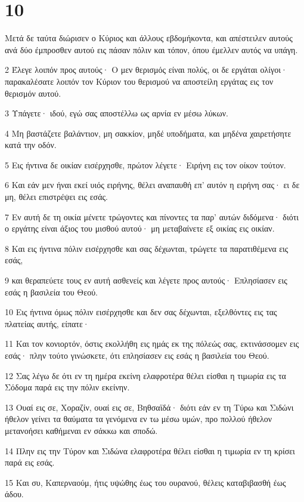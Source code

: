 \chapter{10}

\par Μετά δε ταύτα διώρισεν ο Κύριος και άλλους εβδομήκοντα, και απέστειλεν αυτούς ανά δύο έμπροσθεν αυτού εις πάσαν πόλιν και τόπον, όπου έμελλεν αυτός να υπάγη.
\par 2 Έλεγε λοιπόν προς αυτούς· Ο μεν θερισμός είναι πολύς, οι δε εργάται ολίγοι· παρακαλέσατε λοιπόν τον Κύριον του θερισμού να αποστείλη εργάτας εις τον θερισμόν αυτού.
\par 3 Υπάγετε· ιδού, εγώ σας αποστέλλω ως αρνία εν μέσω λύκων.
\par 4 Μη βαστάζετε βαλάντιον, μη σακκίον, μηδέ υποδήματα, και μηδένα χαιρετήσητε κατά την οδόν.
\par 5 Εις ήντινα δε οικίαν εισέρχησθε, πρώτον λέγετε· Ειρήνη εις τον οίκον τούτον.
\par 6 Και εάν μεν ήναι εκεί υιός ειρήνης, θέλει αναπαυθή επ' αυτόν η ειρήνη σας· ει δε μη, θέλει επιστρέψει εις εσάς.
\par 7 Εν αυτή δε τη οικία μένετε τρώγοντες και πίνοντες τα παρ' αυτών διδόμενα· διότι ο εργάτης είναι άξιος του μισθού αυτού· μη μεταβαίνετε εξ οικίας εις οικίαν.
\par 8 Και εις ήντινα πόλιν εισέρχησθε και σας δέχωνται, τρώγετε τα παρατιθέμενα εις εσάς,
\par 9 και θεραπεύετε τους εν αυτή ασθενείς και λέγετε προς αυτούς· Επλησίασεν εις εσάς η βασιλεία του Θεού.
\par 10 Εις ήντινα όμως πόλιν εισέρχησθε και δεν σας δέχωνται, εξελθόντες εις τας πλατείας αυτής, είπατε·
\par 11 Και τον κονιορτόν, όστις εκολλήθη εις ημάς εκ της πόλεώς σας, εκτινάσσομεν εις εσάς· πλην τούτο γινώσκετε, ότι επλησίασεν εις εσάς η βασιλεία του Θεού.
\par 12 Σας λέγω δε ότι εν τη ημέρα εκείνη ελαφροτέρα θέλει είσθαι η τιμωρία εις τα Σόδομα παρά εις την πόλιν εκείνην.
\par 13 Ουαί εις σε, Χοραζίν, ουαί εις σε, Βηθσαϊδά· διότι εάν εν τη Τύρω και Σιδώνι ήθελον γείνει τα θαύματα τα γενόμενα εν τω μέσω υμών, προ πολλού ήθελον μετανοήσει καθήμεναι εν σάκκω και σποδώ.
\par 14 Πλην εις την Τύρον και Σιδώνα ελαφροτέρα θέλει είσθαι η τιμωρία εν τη κρίσει παρά εις εσάς.
\par 15 Και συ, Καπερναούμ, ήτις υψώθης έως του ουρανού, θέλεις καταβιβασθή έως άδου.
